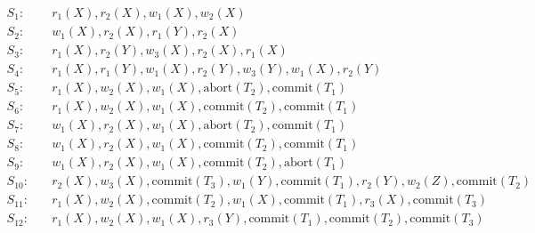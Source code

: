 \begin{problemset}
  \begin{align*}
S_1: & \quad r_1(X),r_2(X),w_1(X),w_2(X)\\
S_2: & \quad w_1(X),r_2(X),r_1(Y),r_2(X)\\
S_3: & \quad r_1(X), r_2(Y),w_3(X),r_2(X),r_1(X)\\
S_4: & \quad r_1(X), r_1(Y), w_1(X), r_2(Y), w_3(Y), w_1(X), r_2(Y) \\
S_5: & \quad r_1(X), w_2(X), w_1(X), \text{abort}(T_2), \text{commit}(T_1) \\
S_6: & \quad r_1(X), w_2(X), w_1(X), \text{commit}(T_2), \text{commit}(T_1) \\
S_7: & \quad w_1(X), r_2(X), w_1(X), \text{abort}(T_2), \text{commit}(T_1) \\
S_8: & \quad w_1(X), r_2(X), w_1(X), \text{commit}(T_2), \text{commit}(T_1) \\
S_9: & \quad w_1(X), r_2(X), w_1(X), \text{commit}(T_2), \text{abort}(T_1) \\
S_{10}: & \quad r_2(X), w_3(X), \text{commit}(T_3), w_1(Y), \text{commit}(T_1), r_2(Y), w_2(Z), \text{commit}(T_2) \\
S_{11}: & \quad r_1(X), w_2(X), \text{commit}(T_2), w_1(X), \text{commit}(T_1), r_3(X), \text{commit}(T_3) \\
S_{12}: & \quad r_1(X), w_2(X), w_1(X), r_3(Y), \text{commit}(T_1), \text{commit}(T_2), \text{commit}(T_3)
\end{align*}
\end{problemset}